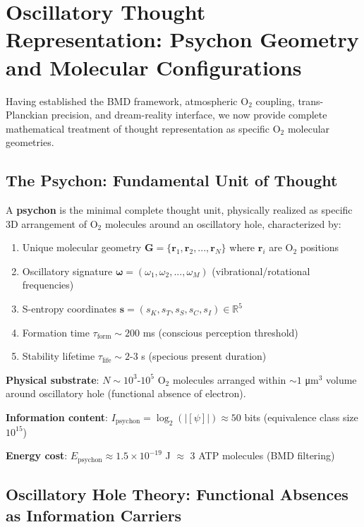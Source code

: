 \documentclass[11pt,onecolumn]{article}
\begin{document}
\clearpage

\section{Oscillatory Thought Representation: Psychon Geometry and Molecular Configurations}

Having established the BMD framework, atmospheric O$_2$ coupling, trans-Planckian precision, and dream-reality interface, we now provide complete mathematical treatment of thought representation as specific O$_2$ molecular geometries.

\subsection{The Psychon: Fundamental Unit of Thought}

\begin{definition}[Psychon]
A \textbf{psychon} is the minimal complete thought unit, physically realized as specific 3D arrangement of O$_2$ molecules around an oscillatory hole, characterized by:
\begin{enumerate}
\item Unique molecular geometry $\mathbf{G} = \{\mathbf{r}_1, \mathbf{r}_2, ..., \mathbf{r}_N\}$ where $\mathbf{r}_i$ are O$_2$ positions
\item Oscillatory signature $\boldsymbol{\omega} = (\omega_1, \omega_2, ..., \omega_M)$ (vibrational/rotational frequencies)
\item S-entropy coordinates $\mathbf{s} = (s_K, s_T, s_S, s_C, s_I) \in \mathbb{R}^5$
\item Formation time $\tau_{\text{form}} \sim 200$ ms (conscious perception threshold)
\item Stability lifetime $\tau_{\text{life}} \sim 2$-3 s (specious present duration)
\end{enumerate}
\end{definition}

\textbf{Physical substrate}: $N \sim 10^{3}$-$10^{5}$ O$_2$ molecules arranged within $\sim 1$ μm$^3$ volume around oscillatory hole (functional absence of electron).

\textbf{Information content}: $I_{\text{psychon}} = \log_2(|[\psi]|) \approx 50$ bits (equivalence class size $10^{15}$)

\textbf{Energy cost}: $E_{\text{psychon}} \approx 1.5 \times 10^{-19}$ J $\approx$ 3 ATP molecules (BMD filtering)

\subsection{Oscillatory Hole Theory: Functional Absences as Information Carriers}
\end{document}
